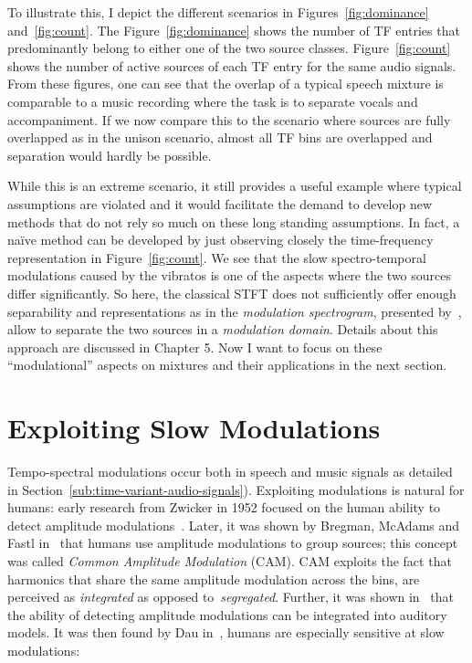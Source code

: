 To illustrate this, I depict the different scenarios in Figures~\ref{fig:dominance} and~\ref{fig:count}.
The Figure~\ref{fig:dominance} shows the number of TF entries that predominantly belong to either one of the two source classes.
Figure~\ref{fig:count} shows the number of active sources of each TF entry for the same audio signals.
From these figures, one can see that the overlap of a typical speech mixture is comparable to a music recording where the task is to separate vocals and accompaniment.
If we now compare this to the scenario where sources are fully overlapped as in the unison scenario, almost all TF bins are overlapped and separation would hardly be possible.
\par
While this is an extreme scenario, it still provides a useful example where typical assumptions are violated and it would facilitate the demand to develop new methods that do not rely so much on these long standing assumptions.
In fact, a naïve method can be developed by just observing closely the time-frequency representation in Figure~\ref{fig:count}.
We see that the slow spectro-temporal modulations caused by the vibratos is one of the aspects where the two sources differ significantly.
So here, the classical STFT does not sufficiently offer enough separability and representations as in the \emph{modulation spectrogram}, presented by~\cite{greenberg96}, allow to separate the two sources in a \emph{modulation domain}.
Details about this approach are discussed in Chapter 5.
Now I want to focus on these ``modulational'' aspects on mixtures and their applications in the next section.

\hypertarget{exploiting-slow-modulations}{%
\section{Exploiting Slow Modulations}\label{exploiting-slow-modulations}}

Tempo-spectral modulations occur both in speech and music signals as detailed in Section~\ref{sub:time-variant-audio-signals}).
Exploiting modulations is natural for humans: early research from Zwicker in 1952 focused on the human ability to detect amplitude modulations~\cite{zwicker52}. 
Later, it was shown by Bregman, McAdams and Fastl in~\cite{mcadams89, bregman90, fastl90} that humans use amplitude modulations to group sources; this concept was called \emph{Common Amplitude Modulation} (CAM).
CAM exploits the fact that harmonics that share the same amplitude modulation across the bins, are perceived as \emph{integrated} as opposed to~\emph{segregated}.
Further, it was shown in~\cite{bacon89} that the ability of detecting amplitude modulations can be integrated into auditory models.
It was then found by Dau in~\cite{dau99}, humans are especially sensitive at slow modulations:

